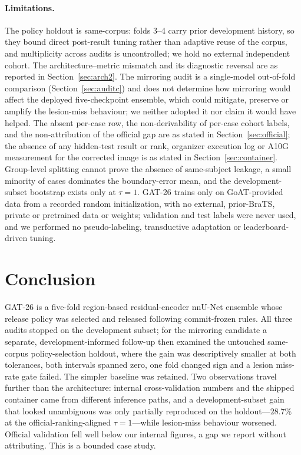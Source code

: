 \documentclass[runningheads]{llncs}
\begin{document}
\paragraph{Limitations.} The policy holdout is same-corpus: folds 3--4 carry prior development
history, so they bound direct post-result tuning rather than adaptive reuse of the corpus, and
multiplicity across audits is uncontrolled; we hold no external independent cohort. The
architecture--metric mismatch and its diagnostic reversal are as reported in
Section~\ref{sec:arch2}. The mirroring audit is a single-model out-of-fold comparison
(Section~\ref{sec:auditc}) and does not determine how mirroring would affect the deployed
five-checkpoint ensemble, which could mitigate, preserve or amplify the lesion-miss behaviour; we
neither adopted it nor claim it would have helped. The absent per-case row, the
non-derivability of per-case cohort labels, and the non-attribution of the official gap are as
stated in Section~\ref{sec:official}; the absence of any hidden-test result or rank, organizer
execution log or A10G measurement for the corrected image is as stated in
Section~\ref{sec:container}. Group-level splitting cannot prove the absence of same-subject leakage, a small minority of cases
dominates the boundary-error mean, and the development-subset bootstrap exists only at $\tau=1$.
GAT-26 trains only on GoAT-provided data from a recorded random initialization, with no external,
prior-BraTS, private or pretrained data or weights; validation and test labels were never used, and
we performed no pseudo-labeling, transductive adaptation or leaderboard-driven tuning.

\section{Conclusion}
GAT-26 is a five-fold region-based residual-encoder nnU-Net ensemble whose release policy was
selected and released following commit-frozen rules. All three audits stopped on the development
subset; for the mirroring candidate a separate, development-informed follow-up then examined the
untouched same-corpus policy-selection holdout, where the gain was descriptively smaller at both
tolerances, both intervals spanned zero, one fold changed sign and a lesion miss-rate gate failed.
The simpler baseline was retained. Two observations travel further than the architecture: internal
cross-validation numbers and the shipped container came from different inference paths, and a
development-subset gain that looked unambiguous was only partially reproduced on the
holdout---$28.7\%$ at the official-ranking-aligned $\tau=1$---while lesion-miss behaviour worsened.
Official validation fell well below our internal figures, a gap we report without attributing. This is
a bounded case study.
\end{document}
